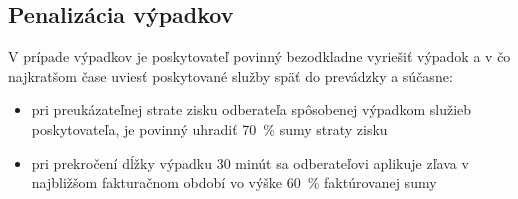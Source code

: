 \documentclass[a4paper, 11pt]{article}
\begin{document}
\begin{center}
\subsection*{Penalizácia výpadkov}
V prípade výpadkov je poskytovateľ povinný bezodkladne vyriešiť výpadok a v čo najkratšom čase uviesť poskytované služby späť do prevádzky a súčasne:
\begin{itemize}
\item pri preukázateľnej strate zisku odberateľa spôsobenej výpadkom služieb poskytovateľa, je povinný uhradiť 70~\% sumy straty zisku
\item pri prekročení dĺžky výpadku 30 minút sa odberateľovi aplikuje zľava v najbližšom fakturačnom období vo výške 60~\% faktúrovanej sumy
\end{itemize}

\end{center}
\end{document}

